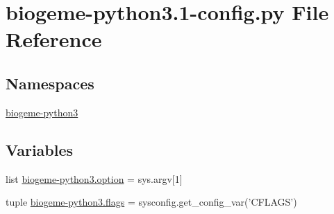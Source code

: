 \hypertarget{biogeme-python3_81-config_8py}{\section{biogeme-\/python3.1-\/config.py File Reference}
\label{biogeme-python3_81-config_8py}
}
\subsection*{Namespaces}
\begin{DoxyCompactItemize}
\item 
 \hyperlink{namespacebiogeme-python3}{biogeme-\/python3}
\end{DoxyCompactItemize}
\subsection*{Variables}
\begin{DoxyCompactItemize}
\item 
list \hyperlink{namespacebiogeme-python3_aa0716b6f7ced61a5074bdb69f56b7d68}{biogeme-\/python3.\+option} = sys.\+argv\mbox{[}1\mbox{]}
\item 
tuple \hyperlink{namespacebiogeme-python3_abf581ce35321a9416791caf6e16f81a9}{biogeme-\/python3.\+flags} = sysconfig.\+get\+\_\+config\+\_\+var('C\+F\+L\+A\+G\+S')
\end{DoxyCompactItemize}
